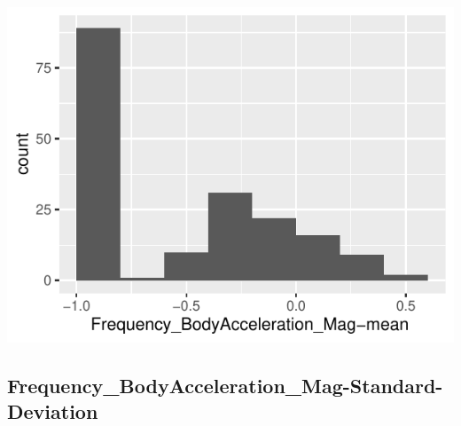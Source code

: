 \documentclass[
]{article}
\begin{document}
\begin{minipage}{0.25 \textwidth}

\includegraphics{codebook_tidydatasub_files/figure-latex/Var-70-Frequency-BodyAcceleration-Mag-mean--1.pdf}

\end{minipage}

\noindent\makebox[\linewidth]{\rule{\textwidth}{0.4pt}}

\hypertarget{frequency_bodyacceleration_mag-standard-deviation}{%
\subsection{Frequency\_BodyAcceleration\_Mag-Standard-Deviation}\label{frequency_bodyacceleration_mag-standard-deviation}}
\end{document}
